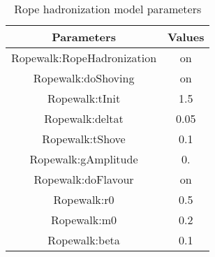 \documentclass[ALICE,manyauthors]{StrinJet}
\begin{document}
\begin{table}[ht]
	\label{tab:Ropeparameter}
	\begin{center}
		\begin{tabular}{|c|c|}
			\hline
			Parameters & Values \\
			\hline 
			Ropewalk:RopeHadronization & on \\
			Ropewalk:doShoving & on  \\
			Ropewalk:tInit & 1.5 \\
			Ropewalk:deltat & 0.05 \\
			Ropewalk:tShove & 0.1 \\
			Ropewalk:gAmplitude & 0. \\
			Ropewalk:doFlavour & on \\
			Ropewalk:r0 & 0.5 \\
			Ropewalk:m0 & 0.2 \\
			Ropewalk:beta & 0.1 \\
			\hline 
		\end{tabular} 
		\caption{Rope hadronization model parameters}
	\end{center}
\end{table}
 
\end{document}
